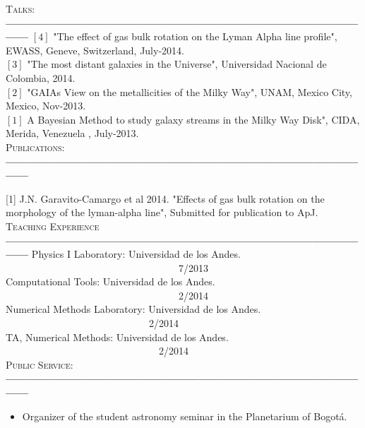 \documentclass[letterpaper]{article}
\begin{document}
\textsc{\Large Talks:}\\
{\bf---------------------------------------------------------------------------------------------------}
$\left[4\right]$ "The effect of gas bulk rotation on the Lyman Alpha line profile", EWASS, Geneve, Switzerland, July-2014.\\
$\left[3\right]$  "The most distant galaxies in the Universe", Universidad Nacional de Colombia, 2014.\\
$\left[2\right]$ "GAIAs View on the metallicities of the Milky Way", UNAM, Mexico City, Mexico, Nov-2013. \\
$\left[1\right]$  A Bayesian Method to study galaxy streams in the Milky Way Disk", CIDA, Merida, Venezuela , July-2013.\\

\textsc{\Large Publications:}\\
{\bf---------------------------------------------------------------------------------------------------}

[1] J.N. Garavito-Camargo et al 2014. "Effects of gas bulk rotation on the morphology of the lyman-alpha line", Submitted for publication to ApJ.\\

\textsc{\Large Teaching Experience}\\
{\bf---------------------------------------------------------------------------------------------------}
Physics I Laboratory: Universidad de los Andes. \indent \ \ \  \ \ \ \ \ \ \ \ \ \ \ \ \ \ \ \ \ \ \ \ \ \ \ \ \ \ \ \ \ \ \ \ 7/2013\\
Computational Tools: Universidad de los Andes. \indent \ \ \  \ \ \ \ \ \ \ \ \ \ \ \ \ \ \ \ \ \ \ \ \ \ \ \ \ \ \ \ \ \ \ \ 2/2014\\
Numerical Methods Laboratory: Universidad de los Andes. \indent \ \ \ \ \ \ \ \ \ \ \ \ \ \ \ \ \ \ \ \ \ \ \ \ \ \ \ \ \  2/2014\\
TA, Numerical Methods: Universidad de los Andes. \indent \ \ \ \ \ \ \ \ \ \ \ \ \ \ \ \ \ \ \ \ \ \ \ \ \ \ \ \ \ \ \  2/2014\\

\textsc{\Large Public Service:}\\
{\bf---------------------------------------------------------------------------------------------------}
\begin{itemize}
\item Organizer of the student astronomy seminar in the Planetarium of Bogot\'a.


\end{itemize}
\end{document}
